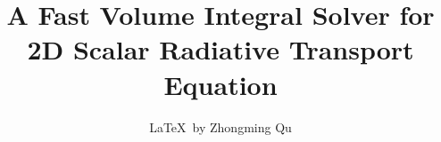 

\usepackage{subfiles} 
\usepackage{hyperref}
\usepackage{xr}

\let\vaccent=\v %
\renewcommand{\v}[1]{\ensuremath{\mathbf{#1}}} %
\let\underdot=\d %
\renewcommand{\d}[2]{\frac{d #1}{d #2}} %
\let\baraccent=\= %
\renewcommand{\=}[1]{\stackrel{#1}{=}} %

\newcommand{\p}[0]{\ensuremath{\prime}} %
\newcommand{\pp}[0]{\ensuremath{{\prime\prime}}} %
\newcommand{\ppp}[0]{\ensuremath{{\prime\prime\prime}}} %

\title{A Fast Volume Integral Solver for 2D Scalar Radiative Transport Equation}
\author{\LaTeX \ by Zhongming Qu}

\maketitle






 

